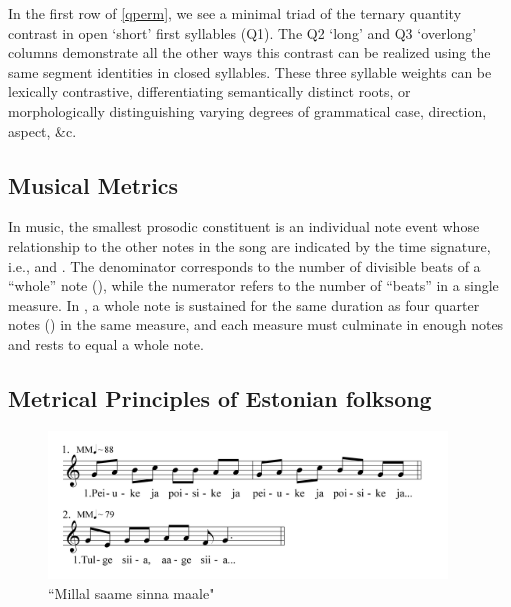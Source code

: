 In the first row of \ref{qperm}, we see a minimal triad of the ternary quantity contrast in open `short' first syllables (Q1). The Q2 `long' and Q3 `overlong' columns demonstrate all the other ways this contrast can be realized using the same segment identities in closed syllables. These three syllable weights can be lexically contrastive, differentiating semantically distinct roots, or morphologically distinguishing varying degrees of grammatical case, direction, aspect, \&c. 



 \subsection{Musical Metrics} 
In music, the smallest prosodic constituent is an individual note event whose relationship to the other notes in the song are indicated by the time signature, i.e.,  and . The denominator corresponds to the number of divisible beats of a ``whole'' note (\semibreve), while the numerator refers to the number of ``beats'' in a single measure. In  , a whole note is sustained for the same duration as  four quarter notes (\crotchet) in the same measure, and each measure must culminate in enough notes and rests to equal a whole note. 





\subsection{Metrical Principles of Estonian folksong}

\begin{figure}[ht]
\begin{center}
\includegraphics[width=300pt]{figures/045.png}
\caption{``Millal saame sinna maale"}
\label{045}
\end{center}
\end{figure}

